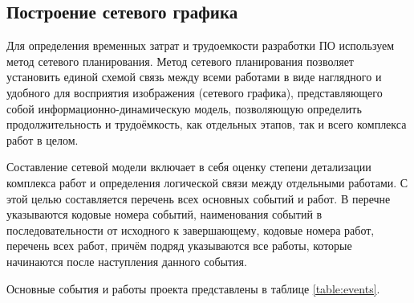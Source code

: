 \subsection{Построение сетевого графика} \label{net_graph}

Для определения временных затрат и трудоемкости разработки ПО используем метод сетевого планирования. Метод сетевого планирования позволяет установить единой схемой связь между всеми работами в виде наглядного и удобного для восприятия изображения (сетевого графика), представляющего собой информационно-динамическую модель, позволяющую определить продолжительность и трудоёмкость, как отдельных этапов, так и всего комплекса работ в целом.

\vspace{\baselineskip}
Составление сетевой модели включает в себя оценку степени детализации комплекса работ и определения логической связи между отдельными работами.
С этой целью составляется перечень всех основных событий и работ. В перечне указываются кодовые номера событий, наименования событий в последовательности от исходного к завершающему, кодовые номера работ, перечень всех работ, причём подряд указываются все работы, которые начинаются после наступления данного события.

\vspace{\baselineskip}
Основные события и работы проекта представлены в таблице \ref{table:events}.


